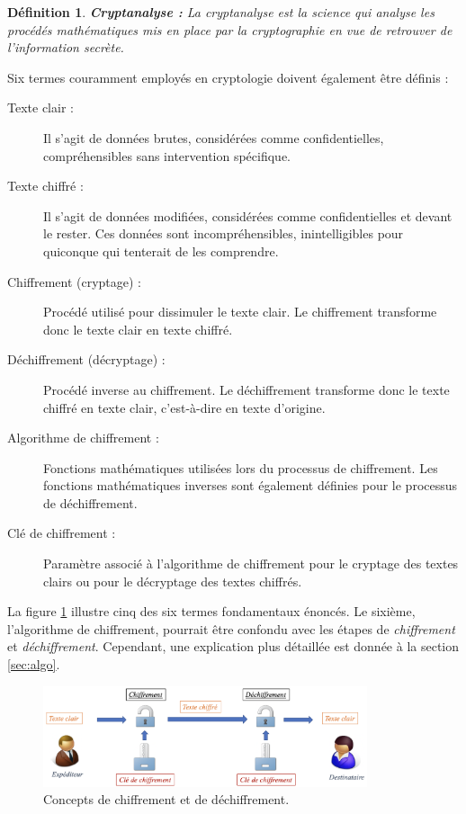 \documentclass[oneside]{book}
\newtheorem{definition}{Définition}[section]
\begin{document}
\begin{definition}{\textbf{Cryptanalyse : }}
La cryptanalyse est la science qui analyse les procédés mathématiques mis en place par la cryptographie en vue de retrouver de l'information secrète. 
\end{definition}

\hspace{-0.5cm}Six termes couramment employés en cryptologie doivent également être définis : 
\begin{description}
\item[Texte clair :] Il s'agit de données brutes, considérées comme confidentielles, compréhensibles sans intervention spécifique.
\item[Texte chiffré :] Il s'agit de données modifiées, considérées comme confidentielles et devant le rester. Ces données sont incompréhensibles, inintelligibles pour quiconque qui tenterait de les comprendre. 
\item[Chiffrement (cryptage) :] Procédé utilisé pour dissimuler le texte clair. Le chiffrement transforme donc le texte clair en texte chiffré.
\item[Déchiffrement (décryptage) :] Procédé inverse au chiffrement. Le déchiffrement transforme donc le texte chiffré en texte clair, c'est-à-dire en texte d'origine.
\item[Algorithme de chiffrement :] Fonctions mathématiques utilisées lors du processus de chiffrement. Les fonctions mathématiques inverses sont également définies pour le processus de déchiffrement.
\item[Clé de chiffrement :] Paramètre associé à l'algorithme de chiffrement pour le cryptage des textes clairs ou pour le décryptage des textes chiffrés. \\
\end{description}

\hspace{-0.5cm}La figure \ref{fig:fondamentaux_crypto} illustre cinq des six termes fondamentaux énoncés. Le sixième, l'algorithme de chiffrement, pourrait être confondu avec les étapes de \textit{chiffrement} et \textit{déchiffrement}. Cependant, une explication plus détaillée est donnée à la section \ref{sec:algo}.

\begin{figure}[htbp]
    \centering
    \includegraphics[width=0.85\textwidth]{image/fondamentaux_crypto}
    \caption{Concepts de chiffrement et de déchiffrement.}
    \label{fig:fondamentaux_crypto}
\end{figure}
\end{document}
